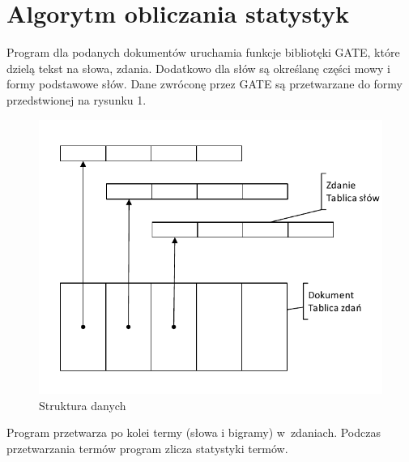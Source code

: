 \documentclass[11pt]{article}
\begin{document}
\section{Algorytm obliczania statystyk}
Program dla podanych dokumentów uruchamia funkcje bibliotęki GATE, które dzielą tekst na słowa, zdania. Dodatkowo dla słów są określanę części mowy i formy podstawowe słów.
Dane zwróconę przez GATE są przetwarzane do formy przedstwionej na rysunku 1.
\begin{figure}
  \begin{center}
    \includegraphics{Struktura danych.pdf}
    \caption{Struktura danych}
  \end{center}
\end{figure}
Program przetwarza po kolei termy (słowa i bigramy) w~zdaniach. Podczas przetwarzania termów program zlicza statystyki termów.
 
\end{document}
